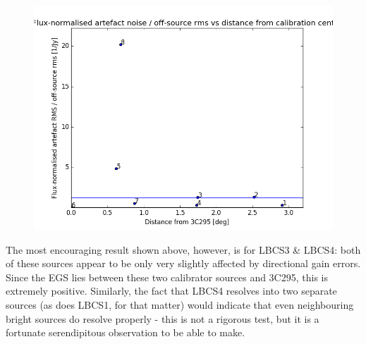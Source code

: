 \begin{figure}[h!]
\includegraphics[width=0.8\linewidth]{images/NormArtefactRMSvsDistFrom3c295.png}
\caption{}
\label{fig.rmsratio.distEGS}
\end{figure}

\pg
The most encouraging result shown above, however, is for LBCS3 \& LBCS4: both of these sources appear to be only very slightly affected by directional gain errors. Since the EGS lies between these two calibrator sources and 3C295, this is extremely positive. Similarly, the fact that LBCS4 resolves into two separate sources (as does LBCS1, for that matter) would indicate that even neighbouring bright sources do resolve properly - this is not a rigorous test, but it is a fortunate serendipitous observation to be able to make.


%



